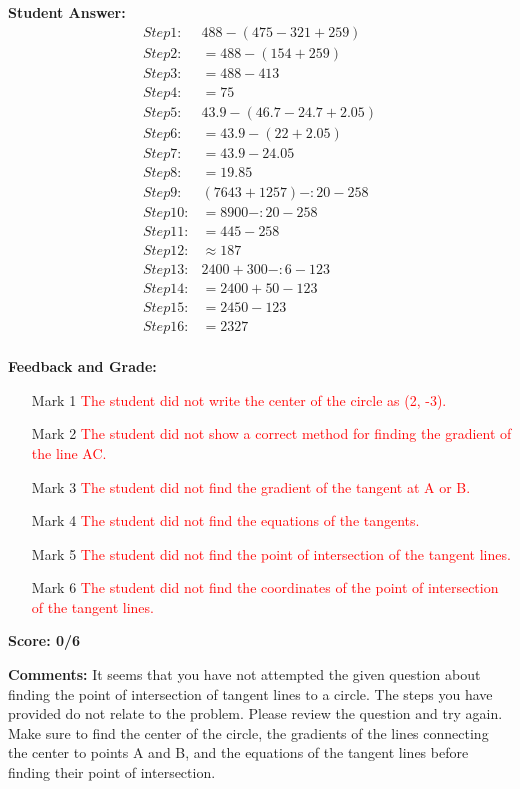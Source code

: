 \documentclass{article}
\begin{document}
\textbf{Student Answer:}
\begin{align*}
Step 1: & 488-(475-321+259) \\
Step 2: & =488-(154+259) \\
Step 3: & =488-413 \\
Step 4: & =75 \\
Step 5: & 43.9-(46.7-24.7+2.05) \\
Step 6: & =43.9-(22+2.05) \\
Step 7: & =43.9-24.05 \\
Step 8: & =19.85 \\
Step 9: & (7643+1257)-:20-258 \\
Step 10: & =8900-:20-258 \\
Step 11: & =445-258 \\
Step 12: & \approx 187 \\
Step 13: & 2400+300-:6-123 \\
Step 14: & =2400+50-123 \\
Step 15: & =2450-123 \\
Step 16: & =2327 \\
\end{align*}

\textbf{Feedback and Grade:}
\begin{itemize}
\item[Mark 1] \textcolor{red}{The student did not write the center of the circle as (2, -3).}
\item[Mark 2] \textcolor{red}{The student did not show a correct method for finding the gradient of the line AC.}
\item[Mark 3] \textcolor{red}{The student did not find the gradient of the tangent at A or B.}
\item[Mark 4] \textcolor{red}{The student did not find the equations of the tangents.}
\item[Mark 5] \textcolor{red}{The student did not find the point of intersection of the tangent lines.}
\item[Mark 6] \textcolor{red}{The student did not find the coordinates of the point of intersection of the tangent lines.}
\end{itemize}

\textbf{Score: 0/6}

\textbf{Comments:} It seems that you have not attempted the given question about finding the point of intersection of tangent lines to a circle. The steps you have provided do not relate to the problem. Please review the question and try again. Make sure to find the center of the circle, the gradients of the lines connecting the center to points A and B, and the equations of the tangent lines before finding their point of intersection.
\end{document}
